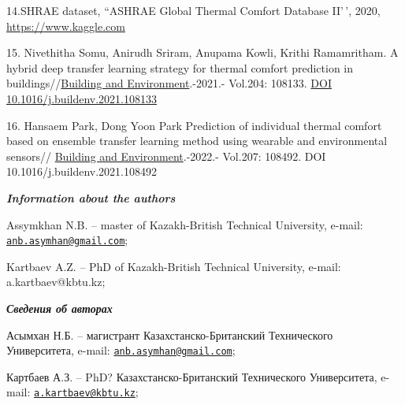 \begin{references}
14.SHRAE dataset, ``ASHRAE Global Thermal Comfort Database II'\,',
2020, \href{https://www.kaggle.com/datasets/claytonmiller/ashrae-global-thermal-comfort-database-ii}{https://www.kaggle.com}

15. Nivethitha Somu, Anirudh Sriram, Anupama Kowli, Krithi Ramamritham.
A hybrid deep transfer learning strategy for thermal comfort prediction
in
buildings//\href{https://www.sciencedirect.com/journal/building-and-environment}{Building
and Environment}.-2021.- Vol.204: 108133.
\href{https://doi.org/10.1016/j.buildenv.2021.108133}{DOI
10.1016/j.buildenv.2021.108133}

16. Hansaem Park, Dong Yoon Park Prediction of individual thermal
comfort based on ensemble transfer learning method using wearable and
environmental sensors//
\href{https://www.sciencedirect.com/journal/building-and-environment}{Building
and Environment}.-2022.- Vol.207: 108492. DOI
10.1016/j.buildenv.2021.108492
\end{references}

\begin{authorinfo}
\hspace{1em}\emph{{\bfseries Information about the authors}}

Assymkhan N.B. -- master of Kazakh-British Technical University, e-mail:
\href{mailto:anb.asymhan@gmail.com}{\nolinkurl{anb.asymhan@gmail.com}};

Kartbaev A.Z. -- PhD of Kazakh-British Technical University, e-mail:
a.kartbaev@kbtu.kz;

\hspace{1em}\emph{{\bfseries Сведения об авторах}}

Асымхан Н.Б. -- магистрант Казахстанско-Британский Технического
Университета, e-mail:
\href{mailto:anb.asymhan@gmail.com}{\nolinkurl{anb.asymhan@gmail.com}};

Картбаев А.З. -- PhD? Казахстанско-Британский Технического Университета,
e-mail:
\href{mailto:a.kartbaev@kbtu.kz}{\nolinkurl{a.kartbaev@kbtu.kz}};
\end{authorinfo}
